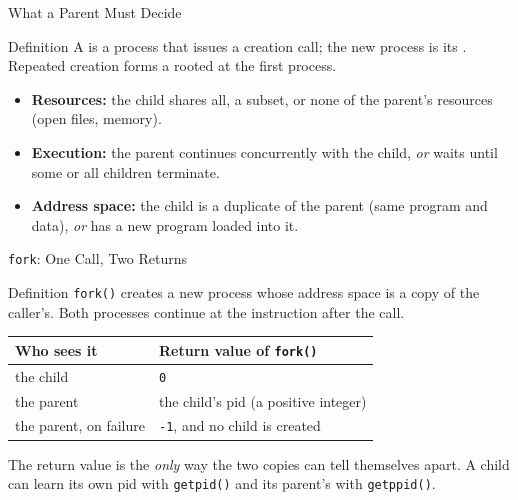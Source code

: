 \documentclass[aspectratio=169]{beamer}
\begin{document}
\begin{frame}{What a Parent Must Decide}
  \begin{block}{Definition}
    A  is a process that issues a creation call; the new
    process is its . Repeated creation forms a 
    rooted at the first process.
  \end{block}
  \begin{itemize}
    \item \textbf{Resources:} the child shares all, a subset, or none of the
      parent's resources (open files, memory).
    \item \textbf{Execution:} the parent continues concurrently with the
      child, \emph{or} waits until some or all children terminate.
    \item \textbf{Address space:} the child is a duplicate of the parent
      (same program and data), \emph{or} has a new program loaded into it.
  \end{itemize}
  \vspace{0.1cm}
\end{frame}

\begin{frame}{\texttt{fork}: One Call, Two Returns}
  \begin{block}{Definition}
    \texttt{fork()} creates a new process whose address space is a copy of the
    caller's. Both processes continue at the instruction after the call.
  \end{block}
  \centering
  \renewcommand{\arraystretch}{1.3}
  \begin{tabular}{p{}p{}}
    \textbf{Who sees it} & \textbf{Return value of \texttt{fork()}} \\
    \hline
    the child & \texttt{0} \\
    the parent & the child's pid (a positive integer) \\
    the parent, on failure & \texttt{-1}, and no child is created \\
  \end{tabular}
  \vspace{0.25cm}

  \raggedright
  \small The return value is the \emph{only} way the two copies can tell
  themselves apart. A child can learn its own pid with \texttt{getpid()} and
  its parent's with \texttt{getppid()}.
\end{frame}
\end{document}
